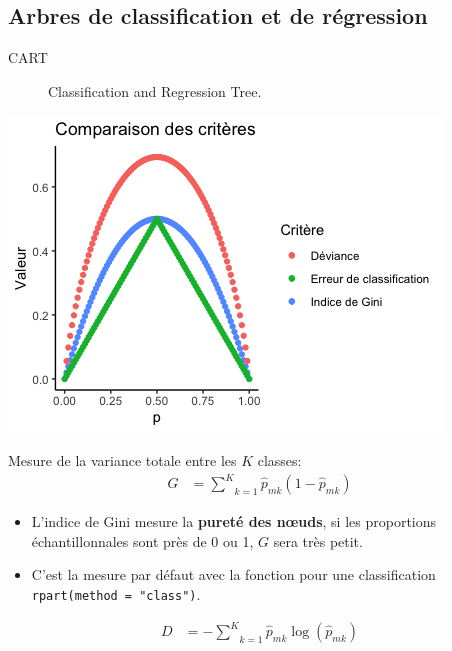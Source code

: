 \documentclass[10pt, french]{article}
\begin{document}
\begin{multicols*}{3}
\pagebreak

\section{Arbres de classification et de régression}

\begin{description}
	\item[CART]	Classification and Regression Tree.
\end{description}

\begin{center}
	\includegraphics[scale=0.4]{src/ACT-3114/CART-criteria.png}
\end{center}

\begin{definitionNOHFILL}
Mesure de la variance totale entre les $K$ classes:
\begin{align*}
	G	
	&=	\underset{k = 1}{\overset{K}{\sum}} \hat{p}_{mk} (1 - \hat{p}_{mk})
\end{align*}
\begin{itemize}[leftmargin = *]
	\item	L'indice de Gini mesure la \textbf{pureté des nœuds}, si les proportions échantillonnales sont près de 0 ou 1, $G$ sera très petit.
	\item	C'est la mesure par défaut avec la fonction pour une classification \texttt{rpart(method = "class")}.
\end{itemize}
\end{definitionNOHFILL}

\begin{definitionNOHFILL}

\begin{align*}
D	
	&=	-\underset{k = 1}{\overset{K}{\sum}} \hat{p}_{mk} \log(\hat{p}_{mk})
\end{align*}
\end{definitionNOHFILL}


\end{multicols*}
\end{document}
